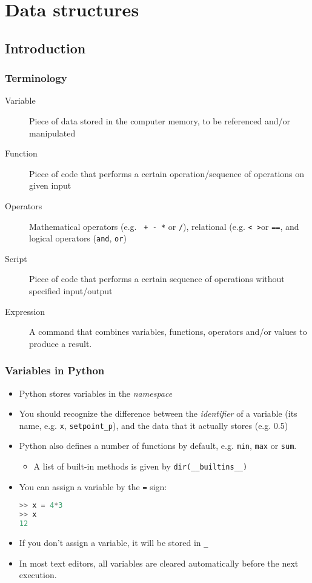 \section{Data structures}
\subsection*{Introduction}
\begin{frame}
 \frametitle{Terminology}
 \begin{description}
  \item[Variable] Piece of data stored in the computer memory, to be referenced and/or manipulated
  \item[Function] Piece of code that performs a certain operation/sequence of operations on given input
  \item[Operators] Mathematical operators (e.g. \lstinline$ + - *$ or \lstinline$/$), relational (e.g. \lstinline$< >$or \lstinline$==$, and logical operators (\lstinline$and$, \lstinline$or$)
  \item[Script] Piece of code that performs a certain sequence of operations without specified input/output
  \item[Expression] A command that combines variables, functions, operators and/or values to produce a result.
 \end{description}
\end{frame}

\begin{frame}[fragile]
 \frametitle{Variables in Python}
  \begin{itemize}
    \item Python stores variables in the \emph{namespace}\pause
    \item You should recognize the difference between the \emph{identifier} of a variable (its name, e.g. \lstinline$x$, \lstinline$setpoint_p$), and the data that it actually stores (e.g. 0.5)\pause
    \item Python also defines a number of functions by default, e.g. \lstinline$min$, \lstinline$max$ or \lstinline$sum$.
    \begin{itemize}
      \item A list of built-in methods is given by \lstinline$dir(__builtins__)$
    \end{itemize}
    \pause
    \item You can assign a variable by the \lstinline$=$ sign:
   \begin{lstlisting}[language=Python, numbers=none]
>> x = 4*3
>> x
12
   \end{lstlisting}\pause
   \item If you don't assign a variable, it will be stored in \lstinline$_$
   \item In most text editors, all variables are cleared automatically before the next execution. 
 \end{itemize}
\end{frame}

